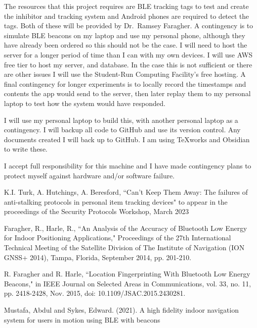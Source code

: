 \documentclass{article}
\begin{document}
The resources that this project requires are BLE tracking tags to test and create the inhibitor and tracking system and
Android phones are required to detect the tags.
Both of these will be provided by Dr.~Ramsey Faragher.
A contingency is to simulate BLE beacons on my laptop and use my personal phone, although they have already been ordered so this should not be the case.
I will need to host the server for a longer period of time than I can with my own devices. I will use AWS free tier to host my server, and database. In the case this is not sufficient or there are other issues I will use  the Student-Run Computing Facility's  free hosting. A final contingency for longer experiments is to locally record the timestamps and contents the app would send to the server, then later replay them to my personal laptop to test how the system would have responded.

I will use my personal laptop to build this, with another personal laptop as a contingency. I will backup all code to GitHub and use its version control. Any documents created I will back up to GitHub. I am using TeXworks and Obsidian to write these.

I accept full responsibility for this machine and I have made contingency plans to protect myself against hardware and/or software failure.

\begin{thebibliography}{9}
\frenchspacing
{} K.I. Turk, A. Hutchings, A. Beresford, ``Can’t Keep Them Away: The failures of anti-stalking protocols in personal item tracking devices" to appear in the proceedings of the Security Protocols Workshop, March 2023

 Faragher, R., Harle, R., ``An Analysis of the Accuracy of Bluetooth Low Energy for Indoor Positioning Applications," Proceedings of the 27th International Technical Meeting of the Satellite Division of The Institute of Navigation (ION GNSS+ 2014), Tampa, Florida, September 2014, pp. 201-210.

R. Faragher and R. Harle, ``Location Fingerprinting With Bluetooth Low Energy Beacons," in IEEE Journal on Selected Areas in Communications, vol. 33, no. 11, pp. 2418-2428, Nov. 2015, doi: 10.1109/JSAC.2015.2430281.

 Mustafa, Abdul and Sykes, Edward. (2021). A high fidelity indoor navigation system for users in motion using BLE with beacons
\end{thebibliography}
\end{document}
